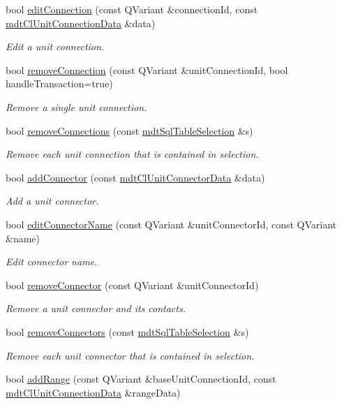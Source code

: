 \begin{DoxyCompactItemize}
bool \hyperlink{classmdt_cl_unit_aac3afb2a4895a16f637b765b44cbca9e}{edit\-Connection} (const Q\-Variant \&connection\-Id, const \hyperlink{classmdt_cl_unit_connection_data}{mdt\-Cl\-Unit\-Connection\-Data} \&data)
\begin{DoxyCompactList}\small\item\em Edit a unit connection. \end{DoxyCompactList}\item 
bool \hyperlink{classmdt_cl_unit_aa4b4f148293abc335704515251ed4f5b}{remove\-Connection} (const Q\-Variant \&unit\-Connection\-Id, bool handle\-Transaction=true)
\begin{DoxyCompactList}\small\item\em Remove a single unit connection. \end{DoxyCompactList}\item 
bool \hyperlink{classmdt_cl_unit_a003f76bd0eaac138d3d2c3e9bf25ef08}{remove\-Connections} (const \hyperlink{classmdt_sql_table_selection}{mdt\-Sql\-Table\-Selection} \&s)
\begin{DoxyCompactList}\small\item\em Remove each unit connection that is contained in selection. \end{DoxyCompactList}\item 
bool \hyperlink{classmdt_cl_unit_acafdba8ebc2f5044b096282ecc41da41}{add\-Connector} (const \hyperlink{classmdt_cl_unit_connector_data}{mdt\-Cl\-Unit\-Connector\-Data} \&data)
\begin{DoxyCompactList}\small\item\em Add a unit connector. \end{DoxyCompactList}\item 
bool \hyperlink{classmdt_cl_unit_a7bb1ff9cc5469f45dbf244fd26d60329}{edit\-Connector\-Name} (const Q\-Variant \&unit\-Connector\-Id, const Q\-Variant \&name)
\begin{DoxyCompactList}\small\item\em Edit connector name. \end{DoxyCompactList}\item 
bool \hyperlink{classmdt_cl_unit_a86244b8f9b2ff41c05b32749c038813d}{remove\-Connector} (const Q\-Variant \&unit\-Connector\-Id)
\begin{DoxyCompactList}\small\item\em Remove a unit connector and its contacts. \end{DoxyCompactList}\item 
bool \hyperlink{classmdt_cl_unit_ae898ad5a28b33cc5fcf501faca13df64}{remove\-Connectors} (const \hyperlink{classmdt_sql_table_selection}{mdt\-Sql\-Table\-Selection} \&s)
\begin{DoxyCompactList}\small\item\em Remove each unit connector that is contained in selection. \end{DoxyCompactList}\item 
bool \hyperlink{classmdt_cl_unit_a35a35f22daf4a408f5400031c12ce3cf}{add\-Range} (const Q\-Variant \&base\-Unit\-Connection\-Id, const \hyperlink{classmdt_cl_unit_connection_data}{mdt\-Cl\-Unit\-Connection\-Data} \&range\-Data)
\end{DoxyCompactItemize}
